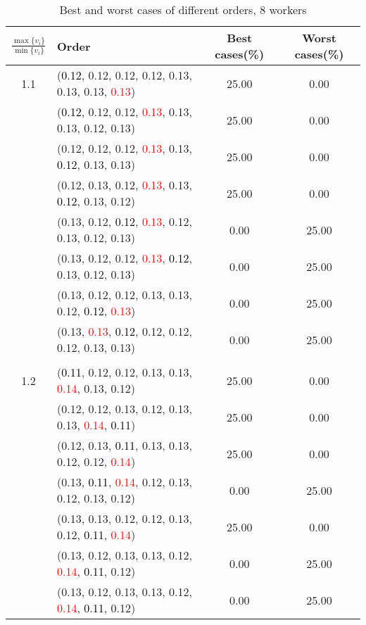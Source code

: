 \documentclass[10pt,a4paper]{report}
\begin{document}
\newpage\begin{center}
	\small
	\begin{longtable}{clcc}
		\caption{Best and worst cases of different orders, 8 workers}\\
		\toprule
		\setlength{\tabcolsep}{1mm}
		\renewcommand\baselinestretch{0.5}\selectfont
		$\frac{\max\{v_i\}}{\min\{v_i\}}$ & Order & Best cases(\%) & Worst cases(\%) \\
			\midrule		1.1			&(\textcolor{black}{0.12}, 0.12, 0.12, 0.12, 0.13, 0.13, 0.13, \textcolor{red}{0.13})&25.00&0.00\\
			&(\textcolor{black}{0.12}, 0.12, 0.12, \textcolor{red}{0.13}, 0.13, 0.13, 0.12, 0.13)&25.00&0.00\\
			&(0.12, 0.12, 0.12, \textcolor{red}{0.13}, 0.13, \textcolor{black}{0.12}, 0.13, 0.13)&25.00&0.00\\
			&(0.12, 0.13, 0.12, \textcolor{red}{0.13}, 0.13, \textcolor{black}{0.12}, 0.13, 0.12)&25.00&0.00\\
			&(0.13, 0.12, \textcolor{black}{0.12}, \textcolor{red}{0.13}, 0.12, 0.13, 0.12, 0.13)&0.00&25.00\\
			&(0.13, 0.12, 0.12, \textcolor{red}{0.13}, \textcolor{black}{0.12}, 0.13, 0.12, 0.13)&0.00&25.00\\
			&(0.13, 0.12, 0.12, 0.13, 0.13, 0.12, \textcolor{black}{0.12}, \textcolor{red}{0.13})&0.00&25.00\\
			&(0.13, \textcolor{red}{0.13}, \textcolor{black}{0.12}, 0.12, 0.12, 0.12, 0.13, 0.13)&0.00&25.00\\
		&&&\\
		1.2			&(\textcolor{black}{0.11}, 0.12, 0.12, 0.13, 0.13, \textcolor{red}{0.14}, 0.13, 0.12)&25.00&0.00\\
			&(0.12, 0.12, 0.13, 0.12, 0.13, 0.13, \textcolor{red}{0.14}, \textcolor{black}{0.11})&25.00&0.00\\
			&(0.12, 0.13, \textcolor{black}{0.11}, 0.13, 0.13, 0.12, 0.12, \textcolor{red}{0.14})&25.00&0.00\\
			&(0.13, \textcolor{black}{0.11}, \textcolor{red}{0.14}, 0.12, 0.13, 0.12, 0.13, 0.12)&0.00&25.00\\
			&(0.13, 0.13, 0.12, 0.12, 0.13, 0.12, \textcolor{black}{0.11}, \textcolor{red}{0.14})&25.00&0.00\\
			&(0.13, 0.12, 0.13, 0.13, 0.12, \textcolor{red}{0.14}, \textcolor{black}{0.11}, 0.12)&0.00&25.00\\
			&(0.13, 0.12, 0.13, 0.13, 0.12, \textcolor{red}{0.14}, \textcolor{black}{0.11}, 0.12)&0.00&25.00\\

\end{longtable}
\end{center}
\end{document}

